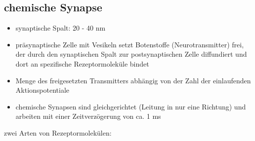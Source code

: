 \subsection{chemische Synapse}
\begin{itemize}
	\item synaptische Spalt: 20 - 40 nm
	\item präsynaptische Zelle mit Vesikeln setzt Botenstoffe (Neurotransmitter) frei, der durch den synaptischen Spalt zur postsynaptischen Zelle diffundiert und dort an spezifische Rezeptormoleküle bindet
	\item Menge des freigesetzten Transmitters abhängig von der Zahl der einlaufenden Aktionspotentiale
	\item chemische Synapsen sind gleichgerichtet (Leitung in nur eine Richtung) und arbeiten mit einer Zeitverzögerung von ca. 1 ms
\end{itemize}
\newpage
zwei Arten von Rezeptormolekülen:
